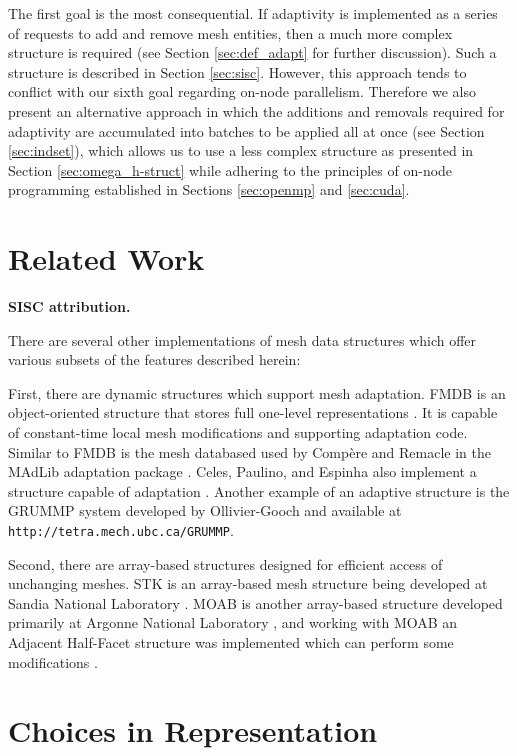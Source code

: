 The first goal is the most consequential.
If adaptivity is implemented as a series of requests to
add and remove mesh entities, then a much more complex structure is required
(see Section \ref{sec:def_adapt} for further discussion).
Such a structure is described in Section \ref{sec:sisc}.
However, this approach tends to conflict with our sixth goal regarding
on-node parallelism.
Therefore we also present an alternative
approach in which the additions and removals required for adaptivity
are accumulated into batches to be applied all at once
(see Section \ref{sec:indset}), which allows us to use a less complex structure
as presented in Section \ref{sec:omega_h-struct} while adhering to the
principles of on-node programming established in Sections
\ref{sec:openmp} and \ref{sec:cuda}.

\section{Related Work}

{\bf SISC attribution.}

There are several other implementations of mesh data structures
which offer various subsets of the features described herein:

First, there are dynamic structures which support mesh adaptation.
FMDB is an object-oriented structure that
stores full one-level representations \cite{seol2006efficient}.
It is capable of constant-time local
mesh modifications and supporting adaptation code.
Similar to FMDB is the mesh databased used by Comp\`{e}re and Remacle
in the MAdLib adaptation package \cite{compere2010mesh}.
Celes, Paulino, and Espinha also implement a structure capable of
adaptation \cite{celes2005compact}.
Another example of an adaptive structure
is the GRUMMP system developed by Ollivier-Gooch
and available at \texttt{http://tetra.mech.ubc.ca/GRUMMP}.

Second, there are array-based structures designed for
efficient access of unchanging meshes.
STK is an array-based mesh structure being developed at
Sandia National Laboratory \cite{edwards2010sierra}.
MOAB is another array-based structure developed primarily
at Argonne National Laboratory \cite{tautges_moab:_2004},
and working with MOAB an Adjacent Half-Facet structure
was implemented which can perform some modifications \cite{dyedov2014ahf}.

\section{Choices in Representation}

